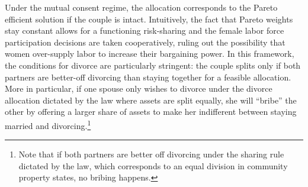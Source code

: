 \documentclass[12pt]{article}
\numberwithin{table}{section}
\begin{document}
 Under the mutual consent regime, the allocation corresponds to the Pareto efficient solution if the couple is intact. Intuitively, the fact that Pareto weights stay constant allows for a functioning risk-sharing and the female labor force participation decisions are taken cooperatively, ruling out the possibility that women over-supply labor to increase their bargaining power. In this framework, the conditions for divorce are particularly stringent: the couple splits only if both partners are better-off divorcing than staying together for a feasible allocation. More in particular, if one spouse only wishes to divorce under the divorce allocation dictated by the law where assets are split equally, she will ``bribe'' the other by offering a larger share of assets to make her indifferent between staying married and divorcing.\footnote{Note that if both partners are better off divorcing under the sharing rule dictated by the law, which corresponds to an equal division in community property states, no bribing happens.}
\end{document}

